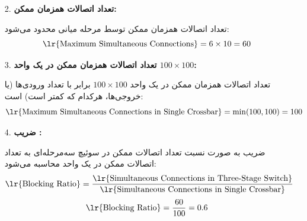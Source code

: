\begin{qsolve}
	\begin{enumerate}
		\item [2.] \textbf{تعداد اتصالات همزمان ممکن:}
		
		تعداد اتصالات همزمان ممکن توسط مرحله میانی محدود می‌شود:
		\[
		\text{\lr{Maximum Simultaneous Connections}} = 6 \times 10 = 60
		\]
		
		
		\item [3.] \textbf{تعداد اتصالات همزمان ممکن در یک  واحد $100 \times 100$:}
		
		تعداد اتصالات همزمان ممکن در یک  واحد \(100 \times 100\) برابر با تعداد ورودی‌ها (یا خروجی‌ها، هرکدام که کمتر است) است:
		\[
		\text{\lr{Maximum Simultaneous Connections in Single Crossbar}} = \min(100, 100) = 100
		\]
		
		\item [4.] \textbf{ضریب :}
		
		ضریب  به صورت نسبت تعداد اتصالات ممکن در سوئیچ سه‌مرحله‌ای به تعداد اتصالات ممکن در یک  واحد محاسبه می‌شود:
		\[
		\text{\lr{Blocking Ratio}} = \frac{\text{\lr{Simultaneous Connections in Three-Stage Switch}}}{\text{\lr{Simultaneous Connections in Single Crossbar}}}
		\]
		\[
		\text{\lr{Blocking Ratio}} = \frac{60}{100} = 0.6
		\]
		
	\end{enumerate}
\end{qsolve}